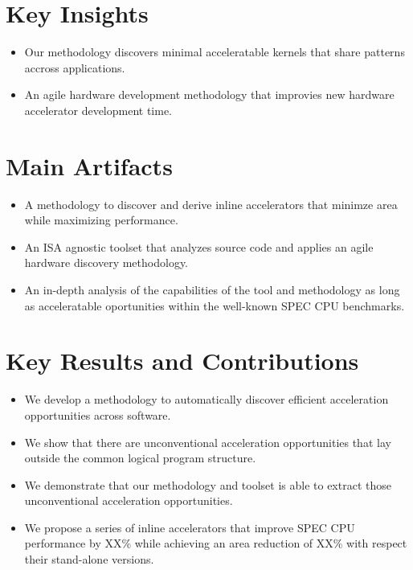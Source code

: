 \documentclass[pageno]{jpaper}
\begin{document}
\section{Key Insights}
\label{sec:key-insights}

\begin{itemize}
  \item Our methodology discovers minimal acceleratable kernels that share patterns
    accross applications.
  \item An agile hardware development methodology that improvies new hardware accelerator development time.
\end{itemize}


\section{Main Artifacts}
\label{sec:main-artifacts}

\begin{itemize}
  \item A methodology to discover and derive inline accelerators that minimze area while maximizing performance.
  \item An ISA agnostic toolset that analyzes source code and applies an agile hardware discovery methodology.
  \item An in-depth analysis of the capabilities of the tool and methodology as long as acceleratable oportunities within the well-known SPEC CPU benchmarks.
\end{itemize}

\section{Key Results and Contributions}
\label{sec:key-contributions}
\begin{itemize}
  \item We develop a methodology to automatically discover efficient acceleration opportunities across software.
  \item We show that there are unconventional acceleration opportunities that lay outside the common logical program structure.
  \item We demonstrate that our methodology and toolset is able to extract those unconventional acceleration opportunities.
  \item We propose a series of inline accelerators that improve SPEC CPU performance by XX\% while achieving an area reduction of XX\% with respect their stand-alone versions.
\end{itemize}
\end{document}

